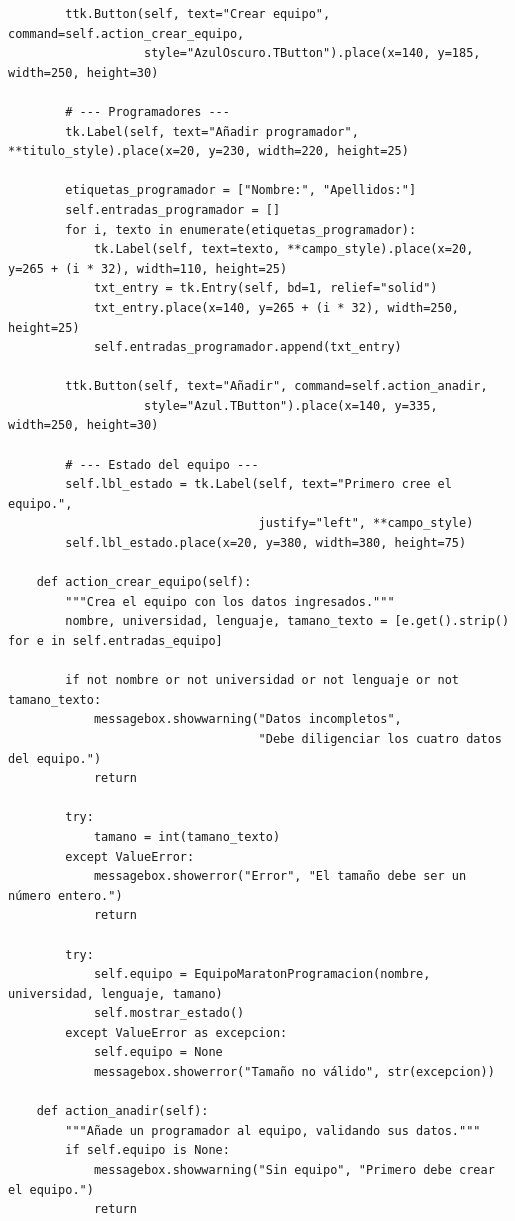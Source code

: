 \documentclass[11pt, a4paper]{article}
\begin{document}
\begin{lstlisting}
        ttk.Button(self, text="Crear equipo", command=self.action_crear_equipo,
                   style="AzulOscuro.TButton").place(x=140, y=185, width=250, height=30)

        # --- Programadores ---
        tk.Label(self, text="Añadir programador", **titulo_style).place(x=20, y=230, width=220, height=25)

        etiquetas_programador = ["Nombre:", "Apellidos:"]
        self.entradas_programador = []
        for i, texto in enumerate(etiquetas_programador):
            tk.Label(self, text=texto, **campo_style).place(x=20, y=265 + (i * 32), width=110, height=25)
            txt_entry = tk.Entry(self, bd=1, relief="solid")
            txt_entry.place(x=140, y=265 + (i * 32), width=250, height=25)
            self.entradas_programador.append(txt_entry)

        ttk.Button(self, text="Añadir", command=self.action_anadir,
                   style="Azul.TButton").place(x=140, y=335, width=250, height=30)

        # --- Estado del equipo ---
        self.lbl_estado = tk.Label(self, text="Primero cree el equipo.",
                                   justify="left", **campo_style)
        self.lbl_estado.place(x=20, y=380, width=380, height=75)

    def action_crear_equipo(self):
        """Crea el equipo con los datos ingresados."""
        nombre, universidad, lenguaje, tamano_texto = [e.get().strip() for e in self.entradas_equipo]

        if not nombre or not universidad or not lenguaje or not tamano_texto:
            messagebox.showwarning("Datos incompletos",
                                   "Debe diligenciar los cuatro datos del equipo.")
            return

        try:
            tamano = int(tamano_texto)
        except ValueError:
            messagebox.showerror("Error", "El tamaño debe ser un número entero.")
            return

        try:
            self.equipo = EquipoMaratonProgramacion(nombre, universidad, lenguaje, tamano)
            self.mostrar_estado()
        except ValueError as excepcion:
            self.equipo = None
            messagebox.showerror("Tamaño no válido", str(excepcion))

    def action_anadir(self):
        """Añade un programador al equipo, validando sus datos."""
        if self.equipo is None:
            messagebox.showwarning("Sin equipo", "Primero debe crear el equipo.")
            return


\end{lstlisting}
\end{document}
